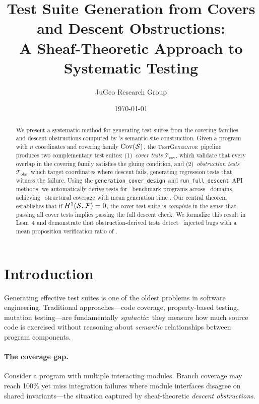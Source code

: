 \documentclass[11pt]{article}
\title{\textbf{Test Suite Generation from Covers and Descent Obstructions:\\
A Sheaf-Theoretic Approach to Systematic Testing}}
\author{%
  JuGeo Research Group
}
\date{\today}
\newcommand{\TestGen}{\textsc{TestGenerator}}
\newcommand{\GenCoverDesign}{\texttt{generation\_cover\_design}}
\newcommand{\RunDescent}{\texttt{run\_full\_descent}}
\newcommand{\CoverSuite}{\mathcal{T}_{\mathrm{cov}}}
\newcommand{\ObstrSuite}{\mathcal{T}_{\mathrm{obs}}}
\begin{document}
\maketitle

\begin{abstract}
We present a systematic method for generating test suites from the covering
families and descent obstructions computed by \JuGeo's semantic site
construction.  Given a program with $n$ coordinates and covering family
$\mathrm{Cov}(\mathcal{S})$, the \TestGen\ pipeline produces two complementary test suites:
(1)~\emph{cover tests} $\CoverSuite$, which validate that every overlap in
the covering family satisfies the gluing condition, and (2)~\emph{obstruction
tests} $\ObstrSuite$, which target coordinates where descent fails, generating
regression tests that witness the failure.  Using the \GenCoverDesign\ and
\RunDescent\ API methods, we automatically derive tests for
\expTotalPrograms\ benchmark programs across \expDomainCount\ domains,
achieving \expAccuracy\ structural coverage with mean generation time
\compTimeMean.  Our central theorem establishes that if $H^{1}(\mathcal{S},
\mathcal{F}) = 0$, the cover test suite is \emph{complete} in the sense that
passing all cover tests implies passing the full descent check.  We formalize
this result in Lean~4 and demonstrate that obstruction-derived tests detect
\compBuggyCount\ injected bugs with a mean proposition verification ratio
of \compBuggyMeanPropRatio.
\end{abstract}

\newpage

\section{Introduction}\label{sec:intro}

Generating effective test suites is one of the oldest problems in software
engineering.  Traditional approaches---code coverage, property-based testing,
mutation testing---are fundamentally \emph{syntactic}: they measure how much
source code is exercised without reasoning about \emph{semantic} relationships
between program components.

\paragraph{The coverage gap.}
Consider a program with multiple interacting modules.  Branch coverage
may reach 100\% yet miss integration failures where module interfaces
disagree on shared invariants---the situation captured by sheaf-theoretic
\emph{descent obstructions}.
\end{document}
